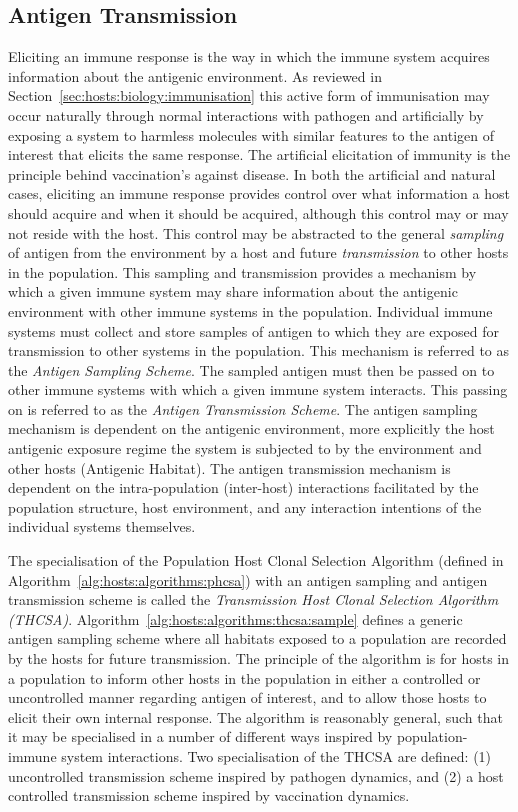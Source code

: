 %
% 
\subsection{Antigen Transmission}
\label{sec:hosts:population:elicited:theory}
Eliciting an immune response is the way in which the immune system acquires information about the antigenic environment. As reviewed in Section~\ref{sec:hosts:biology:immunisation} this active form of immunisation may occur naturally through normal interactions with pathogen and artificially by exposing a system to harmless molecules with similar features to the antigen of interest that elicits the same response. The artificial elicitation of immunity is the principle behind vaccination's against disease. 
In both the artificial and natural cases, eliciting an immune response provides control over what information a host should acquire and when it should be acquired, although this control may or may not reside with the host. 
This control may be abstracted to the general \emph{sampling} of antigen from the environment by a host and future \emph{transmission} to other hosts in the population. This sampling and transmission provides a mechanism by which a given immune system may share information about the antigenic environment with other immune systems in the population. Individual immune systems must collect and store samples of antigen to which they are exposed for transmission to other systems in the population. This mechanism is referred to as the \emph{Antigen Sampling Scheme}. The sampled antigen must then be passed on to other immune systems with which a given immune system interacts. This passing on is referred to as the \emph{Antigen Transmission Scheme}. The antigen sampling mechanism is dependent on the antigenic environment, more explicitly the host antigenic exposure regime the system is subjected to by the environment and other hosts (Antigenic Habitat). The antigen transmission mechanism is dependent on the intra-population (inter-host) interactions facilitated by the population structure, host environment, and any interaction intentions of the individual systems themselves. 

The specialisation of the Population Host Clonal Selection Algorithm (defined in Algorithm~\ref{alg:hosts:algorithms:phcsa}) with an antigen sampling and antigen transmission scheme is called the \emph{Transmission Host Clonal Selection Algorithm (THCSA)}. Algorithm~\ref{alg:hosts:algorithms:thcsa:sample} defines a generic antigen sampling scheme where all habitats exposed to a population are recorded by the hosts for future transmission. The principle of the algorithm is for hosts in a population to inform other hosts in the population in either a controlled or uncontrolled manner regarding antigen of interest, and to allow those hosts to elicit their own internal response. The algorithm is reasonably general, such that it may be specialised in a number of different ways inspired by population-immune system interactions. Two specialisation of the THCSA are defined: (1) uncontrolled transmission scheme inspired by pathogen dynamics, and (2) a host controlled transmission scheme inspired by vaccination dynamics.

